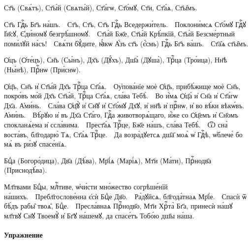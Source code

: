 \documentclass[11pt,a4paper,oneside]{memoir}
\begin{document}
    \begin{slv}
        Ст҃ъ (Свѧ́тъ), Ст҃ы́й (Свѧты́й), Ст҃а́гѡ, Ст҃о́мꙋ, Ст҃и, Ст҃а́ѧ, Ст҃ы̑мъ.
        
        Ст҃ъ Гдⷭ҇ь Бг҃ъ на́шъ.~\textemdash~Ст҃ъ, Ст҃ъ, Ст҃ъ Гдⷭ҇ь Вседержи́тель.~\textemdash~Поклони́мсѧ Ст҃о́мꙋ Гдⷭ҇ꙋ І҆и҃сꙋ, Є҆ди́номꙋ безгрѣ́шномꙋ.~\textemdash~Ст҃ы́й Бж҃е, Ст҃ы́й Крѣ́пкїй, Ст҃ы́й Безсме́ртный поми́лꙋй на́съ!~\textemdash~Свѧ́ти бꙋ́дите, ꙗ҆́кѡ А҆́зъ ст҃ъ (є҆́смь) Гдⷭ҇ь Бг҃ъ ва́шъ.~\textemdash~Ст҃а̑ѧ ст҃ы̑мъ.
        
        Ѻ҆цъ (Ѻ҆те́цъ), Сн҃ъ (Сы́нъ), Дх҃ъ (Дꙋ́хъ), Дш҃а̀ (Дꙋша̀), Трⷪ҇ца (Тро́ица), Нн҃ѣ (Ны́нѣ), Прⷭ҇нѡ (При́снѡ).
        
        Ѻ҆ц҃ъ, Сн҃ъ и҆ Ст҃ы́й Дх҃ъ Трⷪ҇ца Ст҃а́ѧ.~\textemdash~Оу҆пова́нїе моѐ Ѻ҆ц҃ъ, прибѣ́жище моѐ Сн҃ъ, покро́въ мо́й Дх҃ъ Ст҃ы́й, Трⷪ҇ца Ст҃а́ѧ, сла́ва Тебѣ̀.~\textemdash~Во и҆́мѧ Ѻ҆ц҃а̀ и҆ Сн҃а и҆ Ст҃а́гѡ Дх҃а. А҆ми́нь.~\textemdash~Сла́ва Ѻ҆ц҃ꙋ̀ и҆ Сн҃ꙋ и҆ Ст҃о́мꙋ Дх҃ꙋ, и҆ нн҃ѣ и҆ прⷭ҇нѡ, и҆ во вѣ́ки вѣкѡ́въ. А҆ми́нь.~\textemdash~Вѣ́рꙋю и҆ въ Дх҃а Ст҃а́го, Гдⷭ҇а животворѧ́щаго, и҆́же со Ѻ҆ц҃емъ и҆ Сн҃омъ спокланѧ́ема и҆ ссла́вима.~\textemdash~Прест҃а́ѧ Трⷪ҇це, Бж҃е на́шъ, сла́ва Тебѣ̀.~\textemdash~Ѿ сна̀ воста́въ, бл҃годарю̀ Тѧ, Ст҃а́ѧ Трⷪ҇це.~\textemdash~Да возра́дꙋетсѧ дш҃а҃ моѧ̀ ѡ҆ Гдⷭ҇ѣ, ѡ҆блече́ бо мѧ̀ въ ри́зꙋ спасе́нїѧ.
        
        Бцⷣа (Богоро́дица), Дв҃а (Дѣ́ва), Мр҃і́ѧ (Марі́ѧ), Мт҃и (Ма́ти), Прⷭ҇нодв҃а (Приснодѣ́ва).
        
        Мл҃твами Бцⷣы, млⷭ҇тиве, ѡ҆чи́сти мно́жество согрѣше́нїй на́шихъ.~\textemdash~Пребл҃гослове́нна є҆сѝ Бцⷣе Дв҃о.~\textemdash~Ра́дꙋйсѧ, бл҃года́тнаѧ Мр҃і́е.~\textemdash~Спасѝ ѿ бѣ́дъ рабы̑ твоѧ̑, Бцⷣе.~\textemdash~Пресла́внаѧ Прⷭ҇нодв҃о, Мт҃и Хрⷭ҇та̀ Бг҃а, принесѝ на́шꙋ мл҃твꙋ Сн҃ꙋ Твоемꙋ̀ и҆ Бг҃ꙋ на́шемꙋ, да спасе́тъ Тобо́ю дш҃ы на́ша.
    \end{slv}
    \medskip

                    \paragraph{Упражнение}
\end{document}
